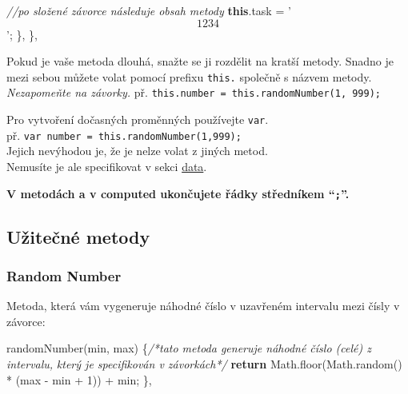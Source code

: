 \documentclass[
]{article}
\newenvironment{Shaded}{}{}
\newcommand{\AttributeTok}[1]{\textcolor[rgb]{0.49,0.56,0.16}{#1}}
\newcommand{\CommentTok}[1]{\textcolor[rgb]{0.38,0.63,0.69}{\textit{#1}}}
\newcommand{\ControlFlowTok}[1]{\textcolor[rgb]{0.00,0.44,0.13}{\textbf{#1}}}
\newcommand{\DecValTok}[1]{\textcolor[rgb]{0.25,0.63,0.44}{#1}}
\newcommand{\KeywordTok}[1]{\textcolor[rgb]{0.00,0.44,0.13}{\textbf{#1}}}
\newcommand{\NormalTok}[1]{#1}
\newcommand{\OperatorTok}[1]{\textcolor[rgb]{0.40,0.40,0.40}{#1}}
\newcommand{\StringTok}[1]{\textcolor[rgb]{0.25,0.44,0.63}{#1}}
\newcommand{\VariableTok}[1]{\textcolor[rgb]{0.10,0.09,0.49}{#1}}
\begin{document}
\begin{Shaded}
\begin{Highlighting}[]
    \CommentTok{//po složené závorce následuje obsah metody}
    \KeywordTok{this}\NormalTok{.}\AttributeTok{task} \OperatorTok{=} \StringTok{'$$ 1234 $$'}\OperatorTok{;}
\NormalTok{    \}}\OperatorTok{,}
\NormalTok{\}}\OperatorTok{,}
\end{Highlighting}
\end{Shaded}

Pokud je vaše metoda dlouhá, snažte se ji rozdělit na kratší metody.
Snadno je mezi sebou můžete volat pomocí prefixu \texttt{this.} společně
s názvem metody. \emph{Nezapomeňte na závorky.} př.
\texttt{this.number\ =\ this.randomNumber(1,\ 999);}

Pro vytvoření dočasných proměnných používejte \texttt{var}.\\
př. \texttt{var\ number\ =\ this.randomNumber(1,999);}\\
Jejich nevýhodou je, že je nelze volat z jiných metod.\\
Nemusíte je ale specifikovat v sekci \protect\hyperlink{data}{data}.

\textbf{V metodách a v computed ukončujete řádky středníkem
``\texttt{;}''.}

\hypertarget{uux17eiteux10dnuxe9-metody}{%
\subsection{Užitečné metody}\label{uux17eiteux10dnuxe9-metody}}

\hypertarget{random-number}{%
\subsubsection{Random Number}\label{random-number}}

Metoda, která vám vygeneruje náhodné číslo v uzavřeném intervalu mezi
čísly v závorce:

\begin{Shaded}
\begin{Highlighting}[]
\AttributeTok{randomNumber}\NormalTok{(min}\OperatorTok{,}\NormalTok{ max) }\OperatorTok{\{}\CommentTok{/*tato metoda generuje náhodné číslo (celé) z intervalu, }
\CommentTok{                        který je specifikován v závorkách*/}
    \ControlFlowTok{return} \VariableTok{Math}\NormalTok{.}\AttributeTok{floor}\NormalTok{(}\VariableTok{Math}\NormalTok{.}\AttributeTok{random}\NormalTok{() }\OperatorTok{*}\NormalTok{ (max }\OperatorTok{-}\NormalTok{ min }\OperatorTok{+} \DecValTok{1}\NormalTok{)) }\OperatorTok{+}\NormalTok{ min}\OperatorTok{;}
\OperatorTok{\},}
\end{Highlighting}
\end{Shaded}
\end{document}
